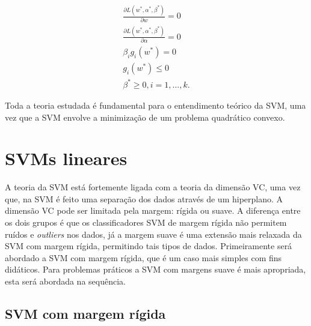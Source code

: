 \begin{equation}
\begin{matrix}
\frac{\partial L(w^*,\alpha^*,\beta^*)}{\partial w} = 0 \\ 
\frac{\partial L(w^*,\alpha^*,\beta^*)}{\partial \alpha} = 0 \\ 
\beta_{i}g_{i}(w^*) = 0 \\
g_{i}(w^*) \leq 0 \\
\beta^* \geq 0, i=1,...,k.
\end{matrix}
\end{equation}


Toda a teoria estudada é fundamental para o entendimento teórico da SVM, uma vez que a SVM envolve a minimização de um problema quadrático convexo.

\section{SVMs lineares}\label{cap:svm:svm-l}

A teoria da SVM está fortemente ligada com a teoria da dimensão VC, uma vez que, na SVM é feito uma separação dos dados através de um hiperplano. A dimensão VC pode ser limitada pela margem: rígida ou suave. A diferença entre os dois grupos é que os classificadores SVM de margem rígida não permitem ruídos e \textit{outliers} nos dados, já a margem suave é uma extensão mais relaxada da SVM com margem rígida, permitindo tais tipos de dados. Primeiramente será abordado a SVM com margem rígida, que é um caso mais simples com fins didáticos. Para problemas práticos a SVM com margens suave é mais apropriada, esta será abordada na sequência.

\subsection{SVM com margem rígida} \label{svmL:S1}

